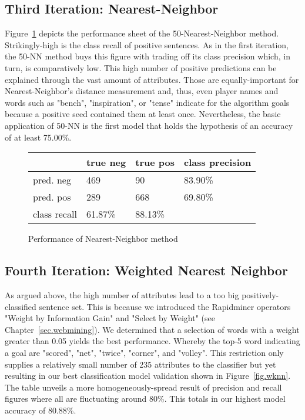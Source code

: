 \documentclass[11pt,titlepage,oneside,openany]{book}
\begin{document}
\subsection{Third Iteration: Nearest-Neighbor}
\label{sec:knn}

Figure~\ref{fig.knn} depicts the performance sheet of the 50-Nearest-Neighbor method. Strikingly-high is the class recall of positive sentences. As in the first iteration, the 50-NN method buys this figure with trading off its class precision which, in turn, is comparatively low. This high number of positive predictions can be explained through the vast amount of attributes. Those are equally-important for Nearest-Neighbor's distance measurement and, thus, even player names and words such as "bench", "inspiration", or "tense" indicate for the algorithm goals because a positive seed contained them at least once. Nevertheless, the basic application of 50-NN is the first model that holds the hypothesis of an accuracy of at least 75.00\%.

\begin{figure} [h!]
\centering
\begin{tabular}{ | l | l | l | l | }
\hline
	 & true neg & true pos & class precision \\ \hline
	pred. neg & 469 & 90 & 83.90\% \\ \hline
	pred. pos & 289 & 668 & 69.80\% \\ \hline
	class recall & 61.87\% & 88.13\% &  \\ \hline
\end{tabular}
\caption{Performance of Nearest-Neighbor method}
\label{fig.knn}
\end{figure}

\subsection{Fourth Iteration: Weighted Nearest Neighbor}
\label{sec:wknn}
As argued above, the high number of attributes lead to a too big positively-classified sentence set. This is because we introduced the Rapidminer operators "Weight by Information Gain" and "Select by Weight" (see Chapter~\ref{sec.webmining}). We determined that a selection of words with a weight greater than 0.05 yields the best performance. Whereby the top-5 word indicating a goal are "scored", "net", "twice", "corner", and "volley". This restriction only supplies a relatively small number of 235 attributes to the classifier but yet resulting in our best classification model validation shown in Figure~\ref{fig.wknn}. The table unveils a more homogeneously-spread result of precision and recall figures where all are fluctuating around 80\%. This totals in our highest model accuracy of 80.88\%.
\end{document}
